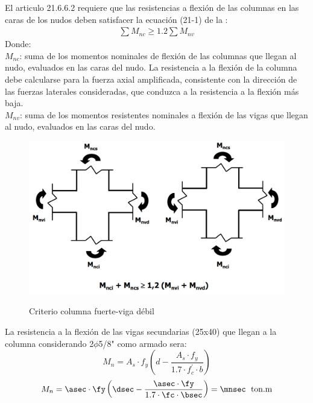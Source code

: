 El articulo 21.6.6.2 requiere que las resistencias a flexión de las columnas en las caras de los nudos deben satisfacer la ecuación (21-1) de la \cite{E-060}:
\begin{align}
\sum M_{nc}\geq 1.2\sum M_{nv}
\end{align}
\noindent Donde:\\
$M_{nc}$: suma de los momentos nominales de flexión de las columnas que llegan al nudo, evaluados en las caras del nudo.   La resistencia a la flexión de la columna debe calcularse para  la  fuerza  axial  amplificada,  consistente  con la  dirección  de  las  fuerzas  laterales consideradas, que conduzca a la resistencia a la flexión más baja.\\
$M_{nv}$: suma de los momentos resistentes nominales a flexión de las vigas que llegan al nudo, evaluados en las caras del nudo.\\
\begin{figure}[h!]
    \centering
    \caption{Criterio columna fuerte-viga débil}
    \includegraphics[scale=0.5]{IMAGENES/cc2.PNG}
    \label{vig}
\end{figure}
\FPset{}
\FPset{}
\FPeval{}
\FPeval{}
\FPeval{}
\noindent La resistencia a la flexión de las vigas secundarias (25x40) que llegan a la columna considerando 2$\phi$5/8" como armado sera:
$$
M_{n}=A_{s}\cdot f_{y}\left ( d-\frac{A_{s}\cdot f_{y}}{1.7\cdot f_{c}^{'}\cdot b} \right )$$
$$
M_{n}=\asec \cdot \fy\left ( \dsec-\frac{\asec\cdot \fy}{1.7\cdot\fc \cdot \bsec} \right )=\mnsec\;\mathrm{~ton.m} 
$$
\FPset{}
\FPeval{}
\noindent 
